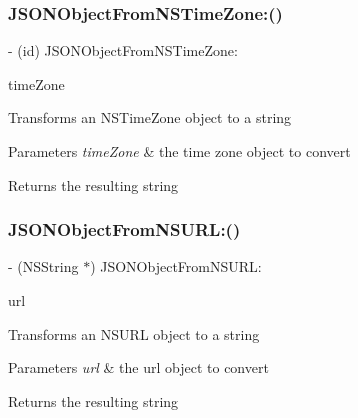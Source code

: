 \subsubsection{\texorpdfstring{J\+S\+O\+N\+Object\+From\+N\+S\+Time\+Zone\+:()}{JSONObjectFromNSTimeZone:()}}
{\footnotesize\ttfamily -\/ (id) J\+S\+O\+N\+Object\+From\+N\+S\+Time\+Zone\+: \begin{DoxyParamCaption}\item[{(N\+S\+Time\+Zone $\ast$)}]{time\+Zone }\end{DoxyParamCaption}}

Transforms an N\+S\+Time\+Zone object to a string 
\begin{DoxyParams}{Parameters}
{\em time\+Zone} & the time zone object to convert \\
\hline
\end{DoxyParams}
\begin{DoxyReturn}{Returns}
the resulting string 
\end{DoxyReturn}
\mbox{\label{interface_o_p_t_l_y_j_s_o_n_value_transformer_a6185fb38d2aa228324f93cf89006685a}} 
\subsubsection{\texorpdfstring{J\+S\+O\+N\+Object\+From\+N\+S\+U\+R\+L\+:()}{JSONObjectFromNSURL:()}}
{\footnotesize\ttfamily -\/ (N\+S\+String $\ast$) J\+S\+O\+N\+Object\+From\+N\+S\+U\+R\+L\+: \begin{DoxyParamCaption}\item[{(N\+S\+U\+RL $\ast$)}]{url }\end{DoxyParamCaption}}

Transforms an N\+S\+U\+RL object to a string 
\begin{DoxyParams}{Parameters}
{\em url} & the url object to convert \\
\hline
\end{DoxyParams}
\begin{DoxyReturn}{Returns}
the resulting string 
\end{DoxyReturn}
\mbox{\label{interface_o_p_t_l_y_j_s_o_n_value_transformer_a3b249f39cbcf415c207881ada5d55708}} 
